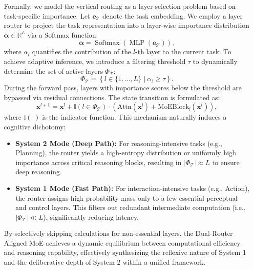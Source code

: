 Formally, we model the vertical routing as a layer selection problem based on task-specific importance. Let $\mathbf{e}_{\mathcal{T}}$ denote the task embedding. We employ a layer router to project the task representation into a layer-wise importance distribution $\boldsymbol{\alpha} \in \mathbb{R}^L$ via a Softmax function:
\begin{equation}
\label{eq:importance_distribution}
\boldsymbol{\alpha} = \operatorname{Softmax}\left( \operatorname{MLP}(\mathbf{e}_{\mathcal{T}}) \right),
\end{equation}
where $\alpha_l$ quantifies the contribution of the $l$-th layer to the current task. To achieve adaptive inference, we introduce a filtering threshold $\tau$ to dynamically determine the set of active layers $\Phi_{\mathcal{T}}$:
\begin{equation}
\Phi_{\mathcal{T}} = \left\{ l \in \{1, \dots, L\} \mid \alpha_l \ge \tau \right\}.
\end{equation}
During the forward pass, layers with importance scores below the threshold are bypassed via residual connections. The state transition is formulated as:
\begin{equation}
\mathbf{x}^{l+1} = \mathbf{x}^l + \mathbb{I}(l \in \Phi_{\mathcal{T}}) \cdot \left( \text{Attn}(\mathbf{x}^l) + \text{MoEBlock}_l(\mathbf{x}^l) \right),
\end{equation}
where $\mathbb{I}(\cdot)$ is the indicator function. This mechanism naturally induces a cognitive dichotomy:
\begin{itemize}
    \item \textbf{System 2 Mode (Deep Path):} For reasoning-intensive tasks (e.g., Planning), the router yields a high-entropy distribution or uniformly high importance across critical reasoning blocks, resulting in $|\Phi_{\mathcal{T}}| \approx L$ to ensure deep reasoning.
    \item \textbf{System 1 Mode (Fast Path):} For interaction-intensive tasks (e.g., Action), the router assigns high probability mass only to a few essential perceptual and control layers. This filters out redundant intermediate computation (i.e., $|\Phi_{\mathcal{T}}| \ll L$), significantly reducing latency.
\end{itemize}
By selectively skipping calculations for non-essential layers, the Dual-Router Aligned MoE achieves a dynamic equilibrium between computational efficiency and reasoning capability, effectively synthesizing the reflexive nature of System 1 and the deliberative depth of System 2 within a unified framework.



